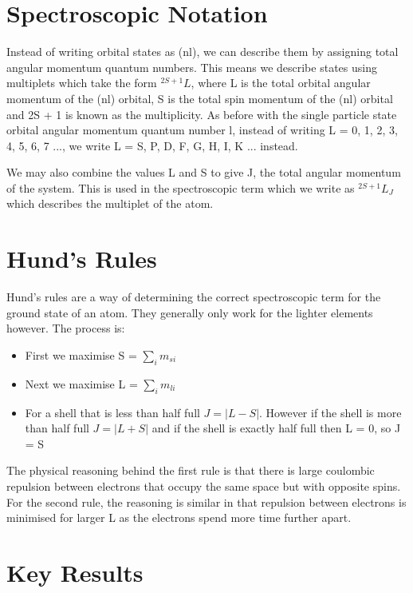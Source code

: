 \section{Spectroscopic Notation}

Instead of writing orbital states as (nl), we can describe them by assigning total angular momentum quantum numbers. This means we describe states using multiplets which take the form $^{2S + 1}L$, where L is the total orbital angular momentum of the (nl) orbital, S is the total spin momentum of the (nl) orbital and 2S + 1 is known as the multiplicity. As before with the single particle state orbital angular momentum quantum number l, instead of writing L = 0, 1, 2, 3, 4, 5, 6, 7 ..., we write L = S, P, D, F, G, H, I, K ... instead.

\noindent We may also combine the values L and S to give J, the total angular momentum of the system. This is used in the spectroscopic term which we write as $^{2S + 1}L_J$ which describes the multiplet of the atom.

\section{Hund's Rules}

Hund's rules are a way of determining the correct spectroscopic term for the ground state of an atom. They generally only work for the lighter elements however. The process is:

\begin{itemize}
    \item First we maximise S = $\sum_i m_{si}$
    \item Next we maximise L = $\sum_i m_{li}$
    \item For a shell that is less than half full $J = |L - S|$. However if the shell is more than half full $J = |L + S|$ and if the shell is exactly half full then L = 0, so J = S
\end{itemize}

\noindent The physical reasoning behind the first rule is that there is large coulombic repulsion between electrons that occupy the same space but with opposite spins. For the second rule, the reasoning is similar in that repulsion between electrons is minimised for larger L as the electrons spend more time further apart.



\section{Key Results}

